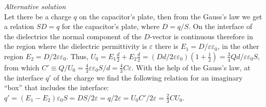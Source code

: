 {\emph{Alternative solution}\\
Let there be a charge $q$ on the capacitor’s plate, then from the Gauss’s law we get a relation $SD=q$ for the capacitor’s plate, where $D=q/S$. On the interface of the dielectrics the normal component of the $D$-vector is continuous therefore in the region where the dielectric permittivity is $\varepsilon$ there is $E_1=D/\varepsilon\varepsilon_0$, in the other region $E_2=D/2\varepsilon\varepsilon_0$. Thus, $U_0=E_1\frac d2+E_2\frac d2=(Dd/2\varepsilon\varepsilon_0)(1+\frac 12)=\frac 34Qd/\varepsilon\varepsilon_0S$, from which $C'\equiv Q/U_0=\frac 43\varepsilon\varepsilon_0S/d=\frac 43C\varepsilon$. With the help of the Gauss’s law, at the interface $q'$ of the charge we find the following relation for an imaginary “box” that includes the interface: $q'=(E_1-E_2)\varepsilon_0S=DS/2\varepsilon=q/2\varepsilon=U_0C'/2\varepsilon=\frac 23CU_0$.
\fi
}